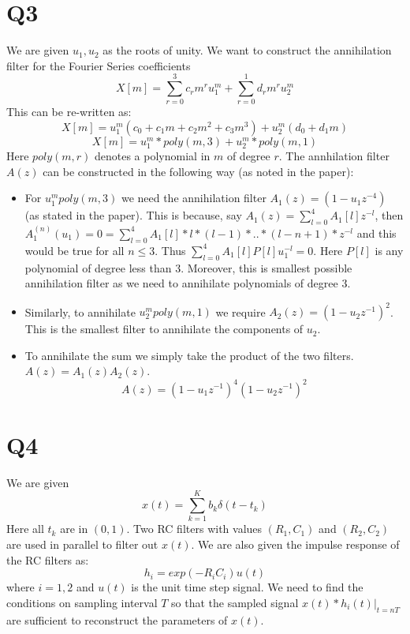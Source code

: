 \documentclass{article}
\begin{document}
\section*{Q3}
We are given $u_1, u_2$ as the roots of unity. We want to construct the annihilation filter for the Fourier Series coefficients $$X[m] = \sum_{r=0}^3 c_r m^r u_1^m + \sum_{r=0}^1 d_r m^r u_2^m$$
This can be re-written as:
$$X[m] = u_1^m (c_0 + c_1 m + c_2 m^2 + c_3 m^3) + u_2^m (d_0 + d_1 m)$$
$$X[m] = u_1^m * poly(m, 3) + u_2^m * poly(m, 1)$$
Here $poly(m, r)$ denotes a polynomial in $m$ of degree $r$.
The annhilation filter $A(z)$ can be constructed in the following way (as noted in the paper):
\begin{itemize}
\item For $u_1^m poly(m, 3)$ we need the annihilation filter $A_1(z) = (1 - u_1z^{-4})$ (as stated in the paper). This is because, say $A_1(z) = \sum_{l=0}^4A_1[l]z^{-l}$, then $A_1^{(n)}(u_1) = 0 = \sum_{l=0}^4A_1[l] * l * (l-1) * .. * (l - n + 1) * z^{-l}$ and this would be true for all $n \le 3$. Thus $\sum_{l=0}^4A_1[l]P[l]u_1^{-l} = 0$. Here $P[l]$ is any polynomial of degree less than $3$. Moreover, this is smallest possible annihilation filter as we need to annihilate polynomials of degree 3.
\item Similarly, to annihilate $u_2^m poly(m, 1)$ we require $A_2(z) = (1 - u_2z^{-1})^2$. This is the smallest filter to annihilate the components of $u_2$.
\item To annihilate the sum we simply take the product of the two filters. $A(z) = A_1(z) A_2(z)$.
  $$A(z) = (1 - u_1z^{-1})^4 (1 - u_2z^{-1})^2$$
\end{itemize}

\section*{Q4}
We are given
$$x(t) = \sum_{k=1}^K b_k \delta (t - t_k)$$
Here all $t_k$ are in $(0, 1)$. Two RC filters with values $(R_1,C_1)$ and $(R_2, C_2)$ are used in parallel to filter out $x(t)$. We are also given the impulse response of the RC filters as:
$$h_i = exp(-R_i C_i) u(t)$$
where $i = 1, 2$ and $u(t)$ is the unit time step signal. We need to find the conditions on sampling interval $T$ so that the sampled signal $x(t) * h_i(t)|_{t = nT}$ are sufficient to reconstruct the parameters of $x(t)$.
\end{document}
